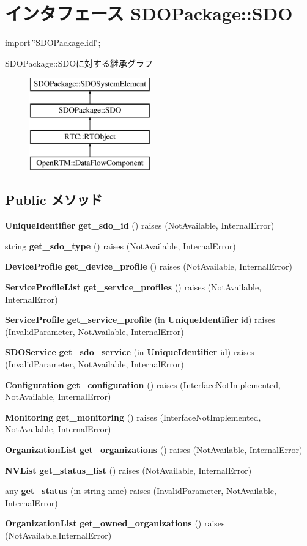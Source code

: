 \section{インタフェース SDOPackage::SDO}
\label{interfaceSDOPackage_1_1SDO}


{\ttfamily import \char`\"{}SDOPackage.idl\char`\"{};}

SDOPackage::SDOに対する継承グラフ\begin{figure}[H]
\begin{center}
\leavevmode
\includegraphics[height=4cm]{interfaceSDOPackage_1_1SDO}
\end{center}
\end{figure}
\subsection*{Public メソッド}
\begin{DoxyCompactItemize}
\item 
{\bf UniqueIdentifier} {\bf get\_\-sdo\_\-id} ()  raises (NotAvailable, InternalError)
\item 
string {\bf get\_\-sdo\_\-type} ()  raises (NotAvailable, InternalError)
\item 
{\bf DeviceProfile} {\bf get\_\-device\_\-profile} ()  raises (NotAvailable, InternalError)
\item 
{\bf ServiceProfileList} {\bf get\_\-service\_\-profiles} ()  raises (NotAvailable, InternalError)
\item 
{\bf ServiceProfile} {\bf get\_\-service\_\-profile} (in {\bf UniqueIdentifier} id)  raises (InvalidParameter, NotAvailable, InternalError)
\item 
{\bf SDOService} {\bf get\_\-sdo\_\-service} (in {\bf UniqueIdentifier} id)  raises (InvalidParameter, NotAvailable, InternalError)
\item 
{\bf Configuration} {\bf get\_\-configuration} ()  raises (InterfaceNotImplemented, NotAvailable, InternalError)
\item 
{\bf Monitoring} {\bf get\_\-monitoring} ()  raises (InterfaceNotImplemented, NotAvailable, InternalError)
\item 
{\bf OrganizationList} {\bf get\_\-organizations} ()  raises (NotAvailable, InternalError)
\item 
{\bf NVList} {\bf get\_\-status\_\-list} ()  raises (NotAvailable, InternalError)
\item 
any {\bf get\_\-status} (in string nme)  raises (InvalidParameter, NotAvailable, InternalError)
\item 
{\bf OrganizationList} {\bf get\_\-owned\_\-organizations} ()  raises (NotAvailable,InternalError)
\end{DoxyCompactItemize}


